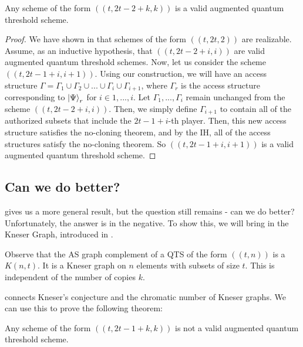 \begin{theorem}
    \label{thm:build-scheme} 
    Any scheme of the form $((t,2t-2+k,k))$ is a valid augmented quantum threshold scheme.
\end{theorem}

\begin{proof}
    We have shown in  that schemes of the form $((t, 2t, 2))$ are realizable. Assume, as an inductive hypothesis, that $((t, 2t - 2 + i, i))$ are valid augmented quantum threshold schemes. Now, let us consider the scheme $((t, 2t-1+i, i+1))$. Using our construction, we will have an access structure $\Gamma = \Gamma_1 \cup \Gamma_2 \cup ... \cup \Gamma_i \cup \Gamma_{i+1}$, where $\Gamma_r$ is the access structure corresponding to $\ket{\Psi}_r$ for $i \in {1,...,i}$. Let $\Gamma_1, ..., \Gamma_i$ remain unchanged from the scheme $((t, 2t - 2 + i, i))$. Then, we simply define $\Gamma_{i+1}$ to contain all of the authorized subsets that include the $2t-1+i$-th player. Then, this new access structure satisfies the no-cloning theorem, and by the IH, all of the access structures satisfy the no-cloning theorem. So $((t, 2t-1+i, i+1))$ is a valid augmented quantum threshold scheme.
\end{proof}

\subsection{Can we do better?}
\label{ssec:better}

 gives us a more general result, but the question still remains - can we do better? Unfortunately, the answer is in the negative. To show this, we will bring in the Kneser Graph, introduced in .

\begin{remark}
    Observe that the AS graph complement of a QTS of the form $((t,n))$ is a $K(n,t)$. It is a Kneser graph on $n$ elements with subsets of size $t$. This is independent of the number of copies $k$.
\end{remark}

 connects Kneser's conjecture and the chromatic number of Kneser graphs. We can use this to prove the following theorem:

\begin{theorem}
    \label{thm:no-more} 
    Any scheme of the form $((t,2t-1+k,k))$ is not a valid augmented quantum threshold scheme.
\end{theorem}

